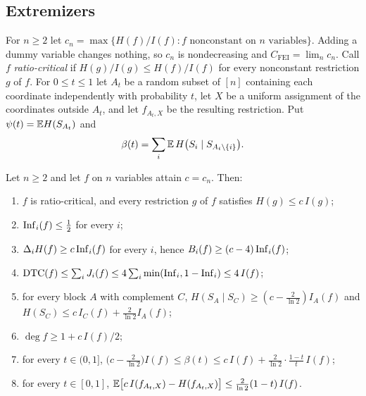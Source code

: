\subsection{Extremizers}
For $n\ge2$ let $c_n=\max\{H(f)/I(f):f\text{ nonconstant on }n\text{ variables}\}$. Adding a dummy variable changes nothing, so $c_n$ is nondecreasing and $C_{\mathrm{FEI}}=\lim_nc_n$. Call $f$ \emph{ratio-critical} if $H(g)/I(g)\le H(f)/I(f)$ for every nonconstant restriction $g$ of $f$. For $0\le t\le1$ let $A_t$ be a random subset of $[n]$ containing each coordinate independently with probability $t$, let $X$ be a uniform assignment of the coordinates outside $A_t$, and let $f_{A_t,X}$ be the resulting restriction. Put $\psi(t)=\mathbb{E} H(S_{A_t})$ and
\[
\beta(t)=\sum_i\mathbb{E}\,H\bigl(S_i\mid S_{A_t\setminus\{i\}}\bigr).
\]

\begin{theorem}\label{thm:extremizer}
Let $n\ge2$ and let $f$ on $n$ variables attain $c=c_n$. Then:
\begin{enumerate}[label=(\roman*)]
\item $f$ is ratio-critical, and every restriction $g$ of $f$ satisfies $H(g)\le c\,I(g)$;
\item $\operatorname{Inf}_i(f)\le\frac12$ for every $i$;
\item $\Delta_iH(f)\ge c\operatorname{Inf}_i(f)$ for every $i$, hence $B_i(f)\ge(c-4)\operatorname{Inf}_i(f)$;
\item $\mathrm{DTC}(f)\le\sum_iJ_i(f)\le4\sum_i\min(\operatorname{Inf}_i,1-\operatorname{Inf}_i)\le4\,I(f)$;
\item for every block $A$ with complement $C$, $H(S_A\mid S_C)\ge(c-\frac2{\ln2})I_A(f)$ and $H(S_C)\le c\,I_C(f)+\frac2{\ln2}I_A(f)$;
\item $\deg f\ge1+c\,I(f)/2$;
\item for every $t\in(0,1]$, $\bigl(c-\frac2{\ln2}\bigr)I(f)\le\beta(t)\le c\,I(f)+\frac{2}{\ln2}\cdot\frac{1-t}{t}\,I(f)$;
\item for every $t\in[0,1]$, $\mathbb{E}\bigl[c\,I(f_{A_t,X})-H(f_{A_t,X})\bigr]\le\frac2{\ln2}(1-t)\,I(f)$.
\end{enumerate}
\end{theorem}

